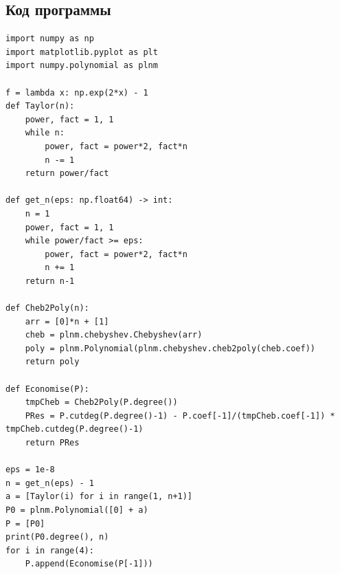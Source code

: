 \subsection*{Код программы}
\begin{lstlisting}
import numpy as np
import matplotlib.pyplot as plt
import numpy.polynomial as plnm

f = lambda x: np.exp(2*x) - 1
def Taylor(n):
    power, fact = 1, 1
    while n:
        power, fact = power*2, fact*n
        n -= 1
    return power/fact

def get_n(eps: np.float64) -> int:
    n = 1
    power, fact = 1, 1
    while power/fact >= eps:
        power, fact = power*2, fact*n
        n += 1
    return n-1

def Cheb2Poly(n):
    arr = [0]*n + [1]
    cheb = plnm.chebyshev.Chebyshev(arr)
    poly = plnm.Polynomial(plnm.chebyshev.cheb2poly(cheb.coef))
    return poly

def Economise(P):
    tmpCheb = Cheb2Poly(P.degree())
    PRes = P.cutdeg(P.degree()-1) - P.coef[-1]/(tmpCheb.coef[-1]) * tmpCheb.cutdeg(P.degree()-1)
    return PRes

eps = 1e-8
n = get_n(eps) - 1
a = [Taylor(i) for i in range(1, n+1)]
P0 = plnm.Polynomial([0] + a)
P = [P0]
print(P0.degree(), n)
for i in range(4):
    P.append(Economise(P[-1]))

\end{lstlisting}